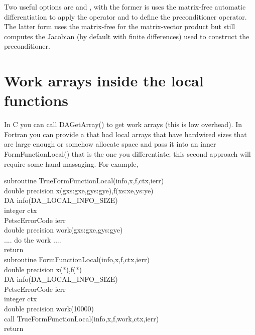 Two useful options are  and ,
with the former is uses the matrix-free automatic differentiation to apply the operator
and to define the preconditioner operator. The latter form uses the matrix-free for the 
matrix-vector product but still computes the Jacobian (by default with finite differences)
used to construct the preconditioner.

\section{Work arrays inside the local functions} In C you can call DAGetArray() to get 
work arrays (this is low overhead). In Fortran you can provide a 
that had local arrays that have hardwired sizes that are large enough or somehow allocate
space and pass it into an inner FormFunctionLocal() that is the one you differentiate; this
second approach will require some hand massaging. For example,

\begin{tabbing}
  subroutine TrueFormFunctionLocal(info,x,f,ctx,ierr)\\
  double precision x(gxs:gxe,gys:gye),f(xs:xe,ys:ye)\\
  DA info(DA\_LOCAL\_INFO\_SIZE)\\
  integer ctx\\
  PetscErrorCode ierr\\
  double precision work(gxs:gxe,gys:gye)\\
   
  .... do the work ....\\


  return\\
   
  subroutine FormFunctionLocal(info,x,f,ctx,ierr)\\

  double precision x(*),f(*)\\
  DA info(DA\_LOCAL\_INFO\_SIZE)\\
  PetscErrorCode ierr\\
  integer ctx\\
  double precision work(10000)\\

  call TrueFormFunctionLocal(info,x,f,work,ctx,ierr)\\
  return
\end{tabbing}

\cleardoublepage
